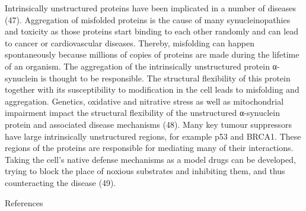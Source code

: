 \documentclass[
]{book}
\begin{document}
Intrinsically unstructured proteins have been implicated in a number of diseases (47). Aggregation of misfolded proteins is the cause of many synucleinopathies and toxicity as those proteins start binding to each other randomly and can lead to cancer or cardiovascular diseases. Thereby, misfolding can happen spontaneously because millions of copies of proteins are made during the lifetime of an organism. The aggregation of the intrinsically unstructured protein α-synuclein is thought to be responsible. The structural flexibility of this protein together with its susceptibility to modification in the cell leads to misfolding and aggregation. Genetics, oxidative and nitrative stress as well as mitochondrial impairment impact the structural flexibility of the unstructured α-synuclein protein and associated disease mechanisms (48). Many key tumour suppressors have large intrinsically unstructured regions, for example p53 and BRCA1. These regions of the proteins are responsible for mediating many of their interactions. Taking the cell's native defense mechanisms as a model drugs can be developed, trying to block the place of noxious substrates and inhibiting them, and thus counteracting the disease (49).

References
\end{document}
